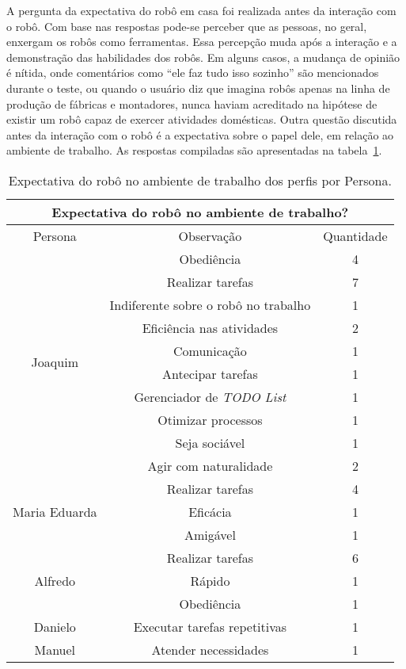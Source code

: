 A pergunta da expectativa do robô em casa foi realizada antes da interação com o robô. Com base nas respostas pode-se perceber que as pessoas, no geral, enxergam os robôs como ferramentas. Essa percepção muda após a interação e a demonstração das habilidades dos robôs. Em alguns casos, a mudança de opinião é nítida, onde comentários como ``ele faz tudo isso sozinho'' são mencionados durante o teste, ou quando o usuário diz que imagina robôs apenas na linha de produção de fábricas e montadores, nunca haviam acreditado na hipótese de existir um robô capaz de exercer atividades domésticas. Outra questão discutida antes da interação com o robô é a expectativa sobre o papel dele, em relação ao ambiente de trabalho. As respostas compiladas são apresentadas na tabela~\ref{tab:expectativatrabalho}.

\begin{table}[!ht]
	\caption{Expectativa do robô no ambiente de trabalho dos perfis por Persona.}
	\label{tab:expectativatrabalho}
	\centering
	\begin{tabular}{c | c | c }
        \hline
        \multicolumn{3}{c}{Expectativa do robô no ambiente de trabalho?} \\
        \hline
        Persona & Observação & Quantidade \\
        \hline
        \multirow{10}{*}{Joaquim} & Obediência & 4 \\
        \hhline{~--}
        & Realizar tarefas & 7 \\
        \hhline{~--}
        & Indiferente sobre o robô no trabalho & 1 \\
        \hhline{~--}
        & Eficiência nas atividades & 2 \\
        \hhline{~--}
        & Comunicação & 1 \\
        \hhline{~--}
        & Antecipar tarefas & 1 \\
        \hhline{~--}
        & Gerenciador de \emph{TODO List} & 1 \\
        \hhline{~--}
        & Otimizar processos & 1 \\
        \hhline{~--}
        & Seja sociável & 1 \\
        \hhline{~--}
        & Agir com naturalidade & 2 \\
        \hline
        \multirow{3}{*}{Maria Eduarda} & Realizar tarefas & 4 \\
        \hhline{~--}
        & Eficácia & 1 \\
        \hhline{~--}
        & Amigável & 1 \\
        \hline
        \multirow{3}{*}{Alfredo} & Realizar tarefas & 6 \\
        \hhline{~--}
        & Rápido & 1 \\
        \hhline{~--}
        & Obediência & 1 \\
        \hline
        Danielo & Executar tarefas repetitivas & 1 \\
        \hline
        Manuel & Atender necessidades & 1 \\
        \hline
    \end{tabular}
\end{table}

